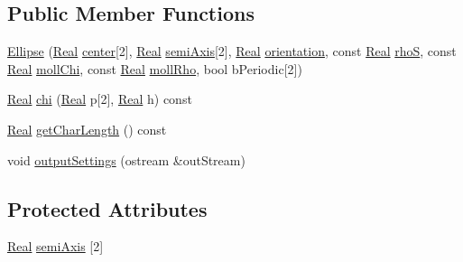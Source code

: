 \subsection*{Public Member Functions}
\begin{DoxyCompactItemize}
\item 
\hyperlink{class_ellipse_a0deee753167fddaf46ee4069f6163d75}{Ellipse} (\hyperlink{_h_d_f5_dumper_8h_a445a5f0e2a34c9d97d69a3c2d1957907}{Real} \hyperlink{class_shape_a865a04fe67fc785b3cbb44806a214248}{center}\mbox{[}2\mbox{]}, \hyperlink{_h_d_f5_dumper_8h_a445a5f0e2a34c9d97d69a3c2d1957907}{Real} \hyperlink{class_ellipse_aa4758f568a38a31bbea0b4b424486a40}{semi\+Axis}\mbox{[}2\mbox{]}, \hyperlink{_h_d_f5_dumper_8h_a445a5f0e2a34c9d97d69a3c2d1957907}{Real} \hyperlink{class_shape_a1778439509ada1f3fa64472610221d19}{orientation}, const \hyperlink{_h_d_f5_dumper_8h_a445a5f0e2a34c9d97d69a3c2d1957907}{Real} \hyperlink{class_shape_a181acdc3063f20a15ba1807f7b6a5d10}{rho\+S}, const \hyperlink{_h_d_f5_dumper_8h_a445a5f0e2a34c9d97d69a3c2d1957907}{Real} \hyperlink{class_shape_ad7d270a8ffc4056d4990424dffdd0488}{moll\+Chi}, const \hyperlink{_h_d_f5_dumper_8h_a445a5f0e2a34c9d97d69a3c2d1957907}{Real} \hyperlink{class_shape_af5aa25175d49bc463fada7b11f2735e1}{moll\+Rho}, bool b\+Periodic\mbox{[}2\mbox{]})
\item 
\hyperlink{_h_d_f5_dumper_8h_a445a5f0e2a34c9d97d69a3c2d1957907}{Real} \hyperlink{class_ellipse_ab4cc2d14593c52c17a78d9d2a7f4ecb9}{chi} (\hyperlink{_h_d_f5_dumper_8h_a445a5f0e2a34c9d97d69a3c2d1957907}{Real} p\mbox{[}2\mbox{]}, \hyperlink{_h_d_f5_dumper_8h_a445a5f0e2a34c9d97d69a3c2d1957907}{Real} h) const 
\item 
\hyperlink{_h_d_f5_dumper_8h_a445a5f0e2a34c9d97d69a3c2d1957907}{Real} \hyperlink{class_ellipse_a51028b0d38b83fc0de8c60c27775ed14}{get\+Char\+Length} () const 
\item 
void \hyperlink{class_ellipse_a58769b0a44b34c8d045be4ef0bcd4a71}{output\+Settings} (ostream \&out\+Stream)
\end{DoxyCompactItemize}
\subsection*{Protected Attributes}
\begin{DoxyCompactItemize}
\item 
\hyperlink{_h_d_f5_dumper_8h_a445a5f0e2a34c9d97d69a3c2d1957907}{Real} \hyperlink{class_ellipse_aa4758f568a38a31bbea0b4b424486a40}{semi\+Axis} \mbox{[}2\mbox{]}
\end{DoxyCompactItemize}
